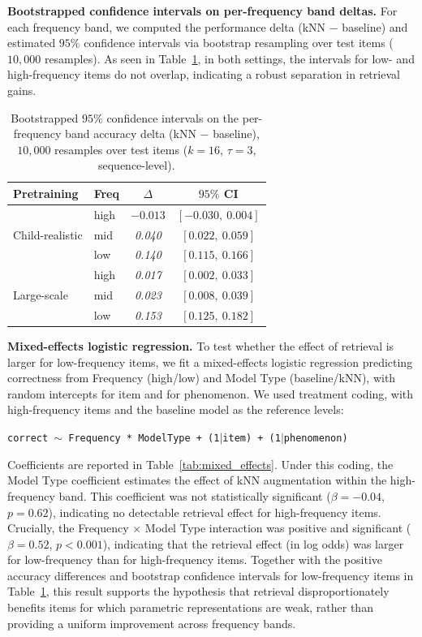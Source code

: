 \noindent \textbf{Bootstrapped confidence intervals on per-frequency band deltas.}
For each frequency band, we computed the performance delta (kNN $-$ baseline) and estimated $95\%$ confidence intervals via bootstrap resampling over test items ($10{,}000$ resamples). As seen in Table~\ref{tab:boot_ci}, in both settings, the intervals for low- and high-frequency items do not overlap, indicating a robust separation in retrieval gains.

\begin{table}[ht]
\centering
\small
\caption{Bootstrapped $95\%$ confidence intervals on the per-frequency band accuracy delta (kNN $-$ baseline), $10{,}000$ resamples over test items ($k=16$, $\tau=3$, sequence-level).}
\label{tab:boot_ci}
\begin{tabular}{llcc}
\toprule
Pretraining & Freq & $\Delta$ & $95\%$ CI \\
\midrule
\multirow{3}{*}{Child-realistic}
& high & \textit{$-0.013$} & \textit{$[-0.030,\ 0.004]$} \\
& mid  & \textit{0.040}    & \textit{$[0.022,\ 0.059]$} \\
& low  & \textit{0.140}    & \textit{$[0.115,\ 0.166]$} \\
\multirow{3}{*}{Large-scale}
& high & \textit{0.017}    & \textit{$[0.002,\ 0.033]$} \\
& mid  & \textit{0.023}    & \textit{$[0.008,\ 0.039]$} \\
& low  & \textit{0.153}    & \textit{$[0.125,\ 0.182]$} \\
\bottomrule
\end{tabular}
\end{table}

\noindent \textbf{Mixed-effects logistic regression.}
To test whether the effect of retrieval is larger for low-frequency items, we fit a mixed-effects logistic regression predicting correctness from Frequency (high/low) and Model Type (baseline/kNN), with random intercepts for item and for phenomenon. We used treatment coding, with high-frequency items and the baseline model as the reference levels:
\begin{center}
\texttt{correct $\sim$ Frequency * ModelType + (1$\mid$item) + (1$\mid$phenomenon)}
\end{center}

Coefficients are reported in Table~\ref{tab:mixed_effects}. Under this coding, the Model Type coefficient estimates the effect of kNN augmentation within the high-frequency band. This coefficient was not statistically significant ($\beta=-0.04$, $p=0.62$), indicating no detectable retrieval effect for high-frequency items. Crucially, the Frequency $\times$ Model Type interaction was positive and significant ($\beta=0.52$, $p<0.001$), indicating that the retrieval effect (in log odds) was larger for low-frequency than for high-frequency items. Together with the positive accuracy differences and bootstrap confidence intervals for low-frequency items in Table~\ref{tab:boot_ci}, this result supports the hypothesis that retrieval disproportionately benefits items for which parametric representations are weak, rather than providing a uniform improvement across frequency bands. 


